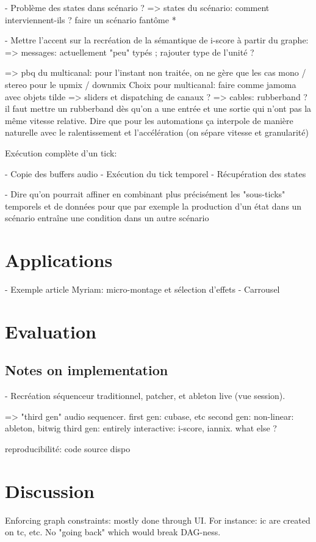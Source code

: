 \documentclass[applsci,article,submit,moreauthors,pdftex,10pt,a4paper]{mdpi}
\begin{document}
- Problème des states dans scénario ?
=> states du scénario: comment interviennent-ils ? faire un scénario fantôme *


- Mettre l'accent sur la recréation de la sémantique de i-score à partir du graphe: 
=> messages: actuellement "peu" typés ; rajouter type de l'unité ? 

=> pbq du multicanal: pour l'instant non traitée, on ne gère que les cas mono / stereo pour le upmix / downmix
Choix pour multicanal: faire comme jamoma avec objets tilde
=> sliders et dispatching de canaux ?
=> cables: rubberband ? il faut mettre un rubberband dès qu'on a une entrée et une sortie qui n'ont pas la même vitesse relative. Dire que pour les automations ça interpole de manière naturelle avec le ralentissement et l'accélération (on sépare vitesse et granularité)

Exécution complète d'un tick: 

- Copie des buffers audio
- Exécution du tick temporel
- Récupération des states

- Dire qu'on pourrait affiner en combinant plus précisément les "sous-ticks" temporels et de données
pour que par exemple la production d'un état dans un scénario entraîne une condition dans un autre scénario


\section{Applications}
- Exemple article Myriam: micro-montage et sélection d'effets
- Carrousel
\section{Evaluation}
\subsection{Notes on implementation}
- Recréation séquenceur traditionnel, patcher, et ableton live (vue session).


=> "third gen" audio sequencer.
first gen: cubase, etc
second gen: non-linear: ableton, bitwig
third gen: entirely interactive: i-score, iannix. what else ? 

reproducibilité: code source dispo
\section{Discussion}
Enforcing graph constraints: mostly done through UI. For instance: ic are created on tc, etc. No "going back" which would break DAG-ness.
\end{document}
